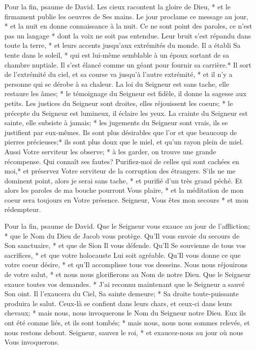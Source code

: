 Pour la fin, psaume de David.
Les cieux racontent la gloire de Dieu, * et le firmament publie les oeuvres de Ses mains.
Le jour proclame ce message au jour, * et la nuit en donne connaissance à la nuit.
Ce ne sont point des paroles, ce n'est pas un langage * dont la voix ne soit pas entendue.
Leur bruit s'est répandu dans toute la terre, * et leurs accents jusqu'aux extrémités du monde.
Il a établi Sa tente dans le soleil, * qui est lui-même semblable à un époux sortant de sa chambre nuptiale. Il s'est élancé comme un géant pour fournir sa carrière.*
Il sort de l'extrémité du ciel, et sa course va jusqu'à l'autre extrémité, * et il n'y a personne qui se dérobe à sa chaleur.
La loi du Seigneur est sans tache, elle restaure les âmes; * le témoignage du Seigneur est fidèle, il donne la sagesse aux petits.
Les justices du Seigneur sont droites, elles réjouissent les coeurs; * le précepte du Seigneur est lumineux, il éclaire les yeux.
La crainte du Seigneur est sainte, elle subsiste à jamais; * les jugements du Seigneur sont vrais, ils se justifient par eux-mêmes.
Ils sont plus désirables que l'or et que beaucoup de pierres précieuses;* ils sont plus doux que le miel, et qu'un rayon plein de miel.
Aussi Votre serviteur les observe; * à les garder, on trouve une grande récompense.
Qui connaît ses fautes? Purifiez-moi de celles qui sont cachées en moi,*
et préservez Votre serviteur de la corruption des étrangers. S'ils ne me dominent point, alors je serai sans tache, * et purifié d'un très grand péché.
Et alors les paroles de ma bouche pourront Vous plaire, * et la méditation de mon coeur sera toujours en Votre présence. Seigneur, Vous êtes mon secours * et mon rédempteur.

Pour la fin, psaume de David.
Que le Seigneur vous exauce au jour de l'affliction; * que le Nom du Dieu de Jacob vous protège.
Qu'Il vous envoie du secours de Son sanctuaire, * et que de Sion Il vous défende.
Qu'Il Se souvienne de tous vos sacrifices, * et que votre holocauste Lui soit agréable.
Qu'Il vous donne ce que votre coeur désire, * et qu'Il accomplisse tous vos desseins.
Nous nous réjouirons de votre salut, * et nous nous glorifierons au Nom de notre Dieu.
Que le Seigneur exauce toutes vos demandes. * J'ai reconnu maintenant que le Seigneur a sauvé Son oint. Il l'exaucera du Ciel, Sa sainte demeure; * Sa droite toute-puissante produira le salut.
Ceux-là se confient dans leurs chars, et ceux-ci dans leurs chevaux; * mais nous, nous invoquerons le Nom du Seigneur notre Dieu.
Eux ils ont été comme liés, et ils sont tombés; * mais nous, nous nous sommes relevés, et nous restons debout.
Seigneur, sauvez le roi, * et exaucez-nous au jour où nous Vous invoquerons.

